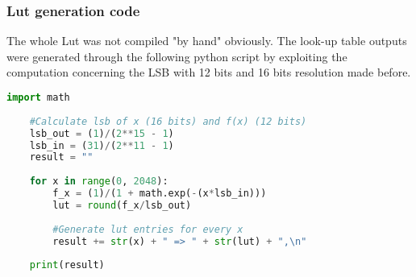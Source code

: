\subsubsection{Lut generation code}
The whole Lut was not compiled "by hand" obviously. The look-up table outputs were generated through the following python script by exploiting the computation concerning the LSB with 12 bits and 16 bits resolution made before.
\begin{lstlisting}[language=Python]
	import math
	
	#Calculate lsb of x (16 bits) and f(x) (12 bits)
	lsb_out = (1)/(2**15 - 1)
	lsb_in = (31)/(2**11 - 1)
	result = ""
	
	for x in range(0, 2048):
		f_x = (1)/(1 + math.exp(-(x*lsb_in)))
		lut = round(f_x/lsb_out)
		
		#Generate lut entries for every x
		result += str(x) + " => " + str(lut) + ",\n"
	
	print(result)
	
\end{lstlisting}